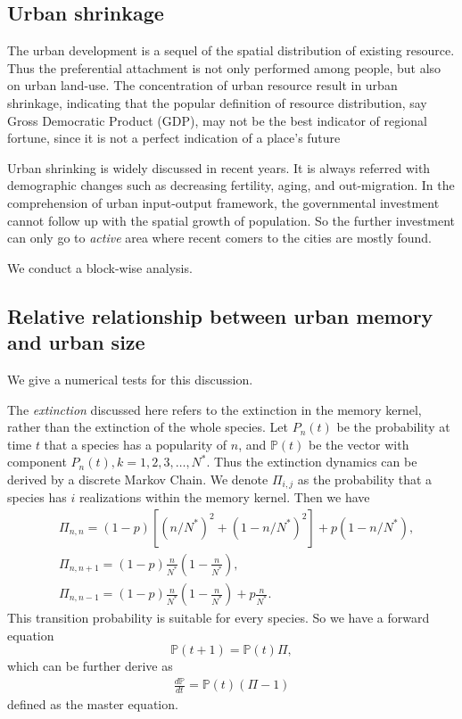 \documentclass[aps,prl]{revtex4-2}
\begin{document}
\subsection{Urban shrinkage}

The urban development is a sequel of the spatial distribution of existing resource. Thus the preferential attachment is not only performed among people, but also on urban land-use. The concentration of urban resource result in urban shrinkage, indicating that the popular definition of resource distribution, say Gross Democratic Product (GDP), may not be the best indicator of regional fortune, since it is not a perfect indication of a place's future 

Urban shrinking is widely discussed in recent years. It is always referred with demographic changes such as decreasing fertility, aging, and out-migration\cite{haase2008urban}. In the comprehension of urban input-output framework, the governmental investment cannot follow up with the spatial growth of population. So the further investment can only go to \emph{active} area where recent comers to the cities are mostly found. 

We conduct a block-wise analysis.

\subsection{Relative relationship between urban memory and urban size}

We give a numerical tests for this discussion. 

The \emph{extinction} discussed here refers to the extinction in the memory kernel, rather than the extinction of the whole species. Let $P_n(t)$ be the probability at time $t$ that a species has a popularity of $n$, and $\mathbb{P}(t)$ be the vector with component $P_n(t),k = 1,2,3,\dots,N^*$. Thus the extinction dynamics can be derived by a discrete Markov Chain. We denote $\Pi_{i,j}$ as the probability that a species has $i$ realizations within the memory kernel. Then we have \begin{align*}
&\Pi_{n,n} = (1-p)[(n/N^*)^2+(1-n/N^*)^2]+p(1-n/N^*),\\
&\Pi_{n,n+1}=(1-p)\frac{n}{N^*}(1-\frac{n}{N^*}),\\ 
&\Pi_{n,n-1}=(1-p)\frac{n}{N^*}(1-\frac{n}{N^*})+p\frac{n}{N^*}.
\end{align*}
This transition probability is suitable for every species. So we have a forward equation $$ \mathbb{P}(t+1) = \mathbb{P}(t)\Pi, $$which can be further derive as \begin{align*}
\frac{d\mathbb{P}}{dt} = \mathbb{P}(t)(\Pi-1)
\end{align*}
defined as the master equation. 
\end{document}
